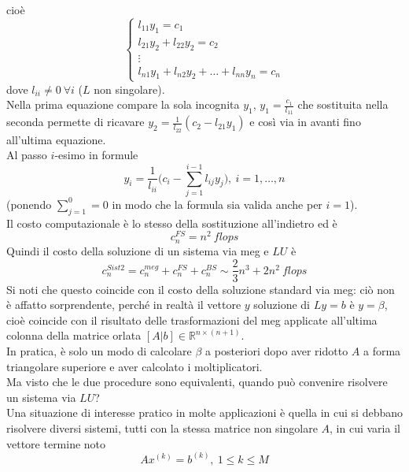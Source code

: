 \documentclass[12pt,a4paper]{article}
\begin{document}
cioè
\begin{equation*}
    \begin{cases}
    l_{11}y_1 = c_1\\ 
    l_{21}y_2 + l_{22}y_2 = c_2 \\ 
    \vdots\\ 
    l_{n1}y_1 +l_{n2}y_2 + \dots + l_{nn}y_{n} = c_n
\end{cases}
\end{equation*}
dove $l_{ii}\neq 0 \ \forall i$ ($L$ non singolare). \\
Nella prima equazione compare la sola incognita $y_1$, $y_1 = \frac{c_1}{l_11}$ che sostituita nella seconda permette di ricavare $y_2=\frac{1}{l_{22}}(c_2 - l_{21}y_1)$ e così via in avanti fino all'ultima equazione. \\
Al passo $i$-esimo in formule
\begin{equation*}
    y_i = \frac{1}{l_{ii}}\biggl( c_i - \sum_{j=1}^{i-1} l_{ij}y_j \biggr), \ i=1,\dots,n
\end{equation*}
(ponendo $\sum_{j=1}^0 = 0$ in modo che la formula sia valida anche per $i=1$).\\
Il costo computazionale è lo stesso della sostituzione all'indietro ed è 
\begin{equation*}
    c_n^{FS} = n^2 \ flops
\end{equation*}
Quindi il costo della soluzione di un sistema via meg e $LU$ è 
\begin{equation*}
    c_n^{Sist2} = c_n^{meg} + c_n^{FS} + c_n^{BS} \sim \frac{2}{3}n^3 + 2n^2 \ flops
\end{equation*}
Si noti che questo coincide con il costo della soluzione standard via meg: ciò non è affatto sorprendente, perché in realtà il vettore $y$ soluzione di $Ly=b$ è $y=\beta$, cioè coincide con il risultato delle trasformazioni del meg applicate all'ultima colonna della matrice orlata $[A|b]\in \mathbb{R}^{n\times (n+1)}$. \\
In pratica, è solo un modo di calcolare $\beta$ a posteriori dopo aver ridotto $A$ a forma triangolare superiore e aver calcolato i moltiplicatori.\\
Ma visto che le due procedure sono equivalenti, quando può convenire risolvere un sistema via $LU$? \\
Una situazione di interesse pratico in molte applicazioni è quella in cui si debbano risolvere diversi sistemi, tutti con la stessa matrice non singolare $A$, in cui varia il vettore termine noto
\begin{equation*}
    Ax^{(k)} = b^{(k)}, \ 1 \leq k \leq M
\end{equation*}
\end{document}

